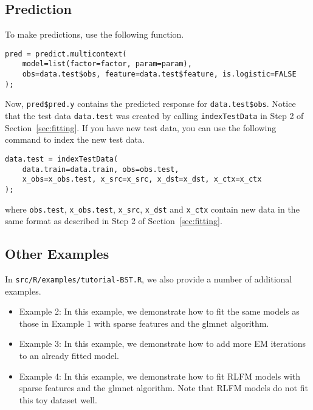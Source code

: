 \documentclass[10pt]{article}
\begin{document}
\subsection{Prediction}

To make predictions, use the following function.
{\small\begin{verbatim}
pred = predict.multicontext(
    model=list(factor=factor, param=param), 
    obs=data.test$obs, feature=data.test$feature, is.logistic=FALSE
);
\end{verbatim}}
\noindent Now, {\tt pred\$pred.y} contains the predicted response for {\tt data.test\$obs}.  Notice that the test data {\tt data.test} was created by calling {\tt indexTestData} in Step 2 of Section~\ref{sec:fitting}.  If you have new test data, you can use the following command to index the new test data.
{\small\begin{verbatim}
data.test = indexTestData(
    data.train=data.train, obs=obs.test,
    x_obs=x_obs.test, x_src=x_src, x_dst=x_dst, x_ctx=x_ctx
);
\end{verbatim}}
\noindent where {\tt obs.test}, {\tt x\_obs.test}, {\tt x\_src}, {\tt x\_dst} and {\tt x\_ctx} contain new data in the same format as described in Step 2 of Section~\ref{sec:fitting}.

\subsection{Other Examples}

In {\tt src/R/examples/tutorial-BST.R}, we also provide a number of additional examples.
\begin{itemize}
\item Example 2: In this example, we demonstrate how to fit the same models as those in Example 1 with sparse features and the glmnet algorithm.
\item Example 3: In this example, we demonstrate how to add more EM iterations to an already fitted model.
\item Example 4: In this example, we demonstrate how to fit RLFM models with sparse features and the glmnet algorithm.  Note that RLFM models do not fit this toy dataset well.
\end{itemize}
\end{document}
